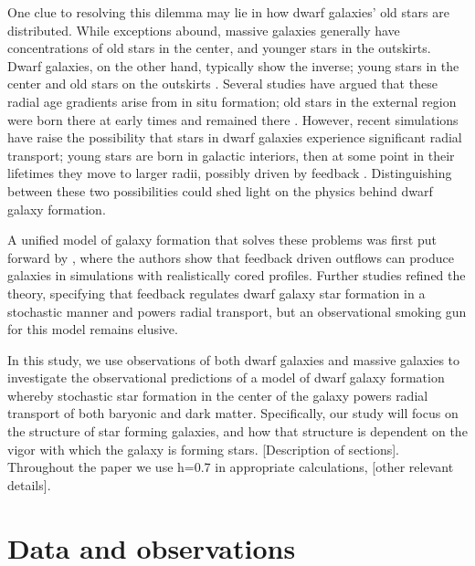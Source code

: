 \documentclass[iop]{emulateapj}
\begin{document}
One clue to resolving this dilemma may lie in how dwarf galaxies' old stars are distributed. While exceptions abound, massive galaxies generally have concentrations of old stars in the center, and younger stars in the outskirts. Dwarf galaxies, on the other hand, typically show the inverse; young stars in the center and old stars on the outskirts \citep{Hidalgo09,Hidalgo13}. Several studies have argued that these radial age gradients arise from in situ formation; old stars in the external region were born there at early times and remained there \citep{Stinson09,Schroyen13}. However, recent simulations have raise the possibility that stars in dwarf galaxies experience significant radial transport; young stars are born in galactic interiors, then at some point in their lifetimes they move to larger radii, possibly driven by feedback \citep{EB17}. Distinguishing between these two possibilities could shed light on the physics behind dwarf galaxy formation.

A unified model of galaxy formation that solves these problems was first put forward by \cite{Governato10}, where the authors show that feedback driven outflows can produce galaxies in simulations with realistically cored profiles. Further studies \citep{Governato12,EB17} refined the theory, specifying that feedback regulates dwarf galaxy star formation in a stochastic manner and powers radial transport, but an observational smoking gun for this model remains elusive. 

In this study, we use observations of both dwarf galaxies and massive galaxies to investigate the observational predictions of a model of dwarf galaxy formation whereby stochastic star formation in the center of the galaxy powers radial transport of both baryonic and dark matter. Specifically, our study will focus on the structure of star forming galaxies, and how that structure is dependent on the vigor with which the galaxy is forming stars. [Description of sections]. Throughout the paper we use h=0.7 in appropriate calculations, [other relevant details]. 

\section{Data and observations}
\label{sec:obs}
\end{document}
